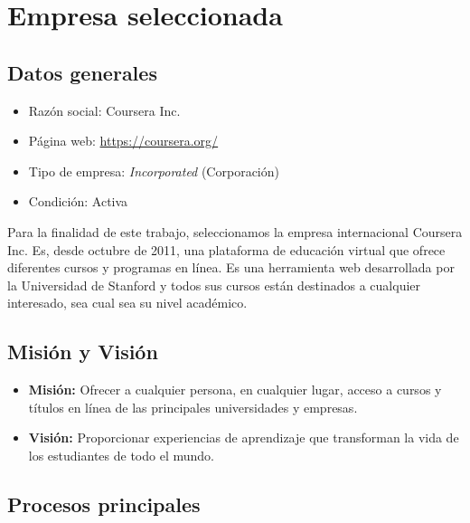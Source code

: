 \documentclass[../main.tex]{subfiles}
\begin{document}
\section{Empresa seleccionada}

\subsection{Datos generales}

\begin{itemize}
  \item Razón social: Coursera Inc.
  \item Página web: \url{https://coursera.org/}
  \item Tipo de empresa: \textit{Incorporated} (Corporación)
  \item Condición: Activa
\end{itemize}

Para la finalidad de este trabajo, seleccionamos la empresa
internacional Coursera Inc. Es, desde octubre de 2011, una
plataforma de educación virtual que ofrece diferentes cursos
y programas en línea. Es una herramienta web desarrollada por
la Universidad de Stanford y todos sus cursos están destinados
a cualquier interesado, sea cual sea su nivel académico.

\subsection{Misión y Visión}

\begin{itemize}
  \item \textbf{Misión:} \newline
        Ofrecer a cualquier persona, en cualquier lugar, acceso
        a cursos y títulos en línea de las principales
        universidades y empresas.
  \item \textbf{Visión:} \newline
        Proporcionar experiencias de aprendizaje que transforman
        la vida de los estudiantes de todo el mundo.
\end{itemize}

\subsection{Procesos principales}
\end{document}
